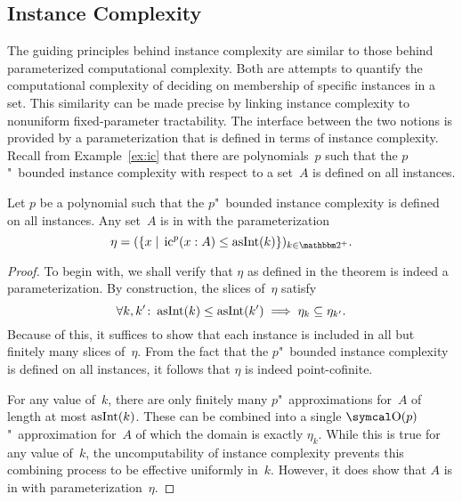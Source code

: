 \subsection{Instance Complexity}
\label{sec:algorithmic:ic}%
The guiding principles behind instance complexity are similar to those behind parameterized computational complexity.
Both are attempts to quantify the computational complexity of deciding on membership of specific instances in a set.
This similarity can be made precise by linking instance complexity to nonuniform fixed-parameter tractability.
The interface between the two notions is provided by a parameterization that is defined in terms of instance complexity.
Recall from Example~\ref{ex:ic} that there are polynomials~$p$ such that the $p$"~bounded instance complexity with respect to a set~$A$ is defined on all instances.
\begin{theorem}
\label{thm:nufptic}%
  Let $p$ be a polynomial such that the $p$"~bounded instance complexity is defined on all instances.
  Any set~$A$ is in  with the parameterization
  \begin{equation*}
    \eta \deq (\{x \st \ic^p(x : A) \le \asNat(k)\})_{k \in \binary^+}.
  \end{equation*}
\end{theorem}
\begin{proof}
  To begin with, we shall verify that $\eta$ as defined in the theorem is indeed a parameterization.
  By construction, the slices of~$\eta$ satisfy
  \begin{equation*}
    \forall k, k'\colon \operatorname{asInt}(k) \le \operatorname{asInt}(k') \implies \eta_k \subseteq \eta_{k'}.
  \end{equation*}
  Because of this, it suffices to show that each instance is included in all but finitely many slices of~$\eta$.
  From the fact that the $p$"~bounded instance complexity is defined on all instances, it follows that $\eta$ is indeed point-cofinite.

  For any value of~$k$, there are only finitely many $p$"~approximations for~$A$ of length at most $\operatorname{asInt}(k)$.
  These can be combined into a single $\bigO(p)$"~approximation for~$A$ of which the domain is exactly $\eta_k$.
  While this is true for any value of~$k$, the uncomputability of instance complexity prevents this combining process to be effective uniformly in~$k$.
  However, it does show that $A$ is in  with parameterization~$\eta$.
\end{proof}

